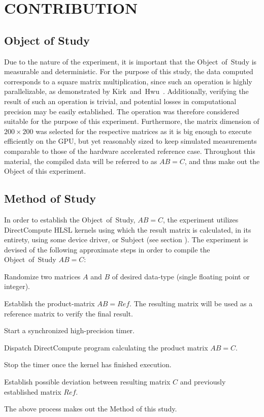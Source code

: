 
\section{CONTRIBUTION}
\label{sec:contribution}

\subsection{Object of Study}
\label{sec:contribution:objectofstudy}
Due to the nature of the experiment, it is important that the Object~of~Study is measurable and deterministic. For the purpose of this study, the data computed corresponds to a square matrix multiplication, since such an operation is highly parallelizable, as demonstrated by Kirk~and~Hwu~\cite[ch.~3]{Kirk:2010:PMP:1841511}.
Additionally, verifying the result of such an operation is trivial, and potential losses in computational precision may be easily established.
The operation was therefore considered suitable for the purpose of this experiment.
Furthermore, the matrix dimension of $200\times 200$ was selected for the respective matrices as it is big enough to execute efficiently on the GPU, but yet reasonably sized to keep simulated measurements comparable to those of the hardware accelerated reference case.
Throughout this material, the compiled data will be referred to as $AB=C$, and thus make out the Object of this experiment.

\subsection{Method of Study}
\label{sec:contribution:methodofstudy}
In order to establish the Object~of~Study, $AB=C$, the experiment utilizes DirectCompute HLSL kernels using which the result matrix is calculated, in its entirety, using some device driver, or Subject (see section ).
The experiment is devised of the following approximate steps in order to compile the Object~of~Study $AB=C$:
\begin{enumerate*}
	\item Randomize two matrices $A$ and $B$ of desired data-type (single floating point or integer).
	\item Establish the product-matrix $AB=Ref$. The resulting matrix will be used as a reference matrix to verify the final result.
	\item Start a synchronized high-precision timer.
	\item Dispatch DirectCompute program calculating the product matrix $AB=C$.
	\item Stop the timer once the kernel has finished execution.
	\item Establish possible deviation between resulting matrix $C$ and previously established matrix $Ref$.
\end{enumerate*}
The above process  makes out the Method of this study.

